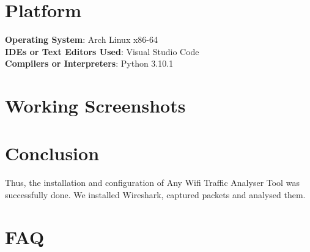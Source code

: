 \documentclass[11pt]{article}
\begin{document}
\section{Platform}
\textbf{Operating System}: Arch Linux x86-64 \\
\textbf{IDEs or Text Editors Used}: Visual Studio Code\\
\textbf{Compilers or Interpreters}: Python 3.10.1\\

\section{Working Screenshots}

\section{Conclusion}
Thus, the installation and configuration of Any Wifi Traffic Analyser Tool was
successfully done. We installed Wireshark, captured packets and analysed them.

\section{FAQ}
\end{document}
